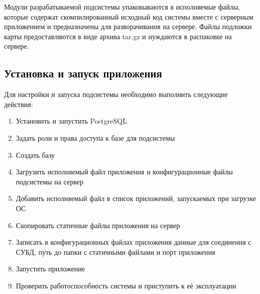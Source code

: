 Модули разрабатываемой подсистемы упаковываются в исполняемые файлы, которые содержат скомпилированный исходный код системы вместе с серверным приложением и предназначены для разворачивания на сервере.
Файлы подложки карты предоставляются в виде архива tar.gz и нуждаются в распаковке на сервере.

\clearpage
\subsection{Установка и запуск приложения}

Для настройки и запуска подсистемы необходимо выполнить следующие действия:

\begin{enumerate}
\item Установить и запустить PostgreSQL 
\item Задать роли и права доступа к базе для подсистемы
\item Создать базу
\item Загрузить исполняемый файл приложения и конфигурационные файлы подсистемы на сервер 
\item Добавить исполняемый файл в список приложений, запускаемых при загрузке ОС 
\item Скопировать статичные файлы приложения на сервер
\item Записать в конфигурационных файлах приложения данные для соединения с СУБД, путь до папки с статичными файлами и порт приложения
\item Запустить приложение
\item Проверить работоспособность системы и приступить к еѐ эксплуатации
\end{enumerate}